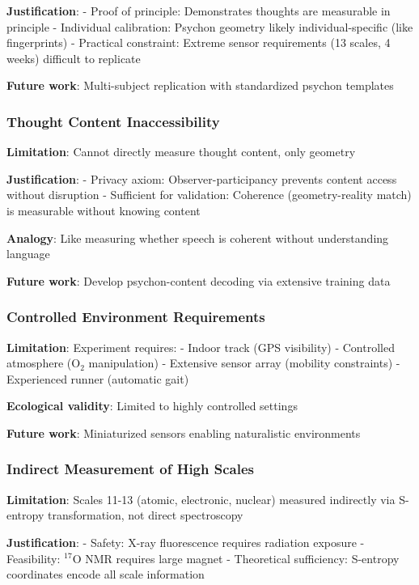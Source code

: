\documentclass[11pt,onecolumn]{article}
\begin{document}
\textbf{Justification}: 
- Proof of principle: Demonstrates thoughts are measurable in principle
- Individual calibration: Psychon geometry likely individual-specific (like fingerprints)
- Practical constraint: Extreme sensor requirements (13 scales, 4 weeks) difficult to replicate

\textbf{Future work}: Multi-subject replication with standardized psychon templates

\subsubsection{Thought Content Inaccessibility}

\textbf{Limitation}: Cannot directly measure thought content, only geometry

\textbf{Justification}:
- Privacy axiom: Observer-participancy prevents content access without disruption
- Sufficient for validation: Coherence (geometry-reality match) is measurable without knowing content

\textbf{Analogy}: Like measuring whether speech is coherent without understanding language

\textbf{Future work}: Develop psychon-content decoding via extensive training data

\subsubsection{Controlled Environment Requirements}

\textbf{Limitation}: Experiment requires:
- Indoor track (GPS visibility)
- Controlled atmosphere (O$_2$ manipulation)
- Extensive sensor array (mobility constraints)
- Experienced runner (automatic gait)

\textbf{Ecological validity}: Limited to highly controlled settings

\textbf{Future work}: Miniaturized sensors enabling naturalistic environments

\subsubsection{Indirect Measurement of High Scales}

\textbf{Limitation}: Scales 11-13 (atomic, electronic, nuclear) measured indirectly via S-entropy transformation, not direct spectroscopy

\textbf{Justification}:
- Safety: X-ray fluorescence requires radiation exposure
- Feasibility: $^{17}$O NMR requires large magnet
- Theoretical sufficiency: S-entropy coordinates encode all scale information
\end{document}
